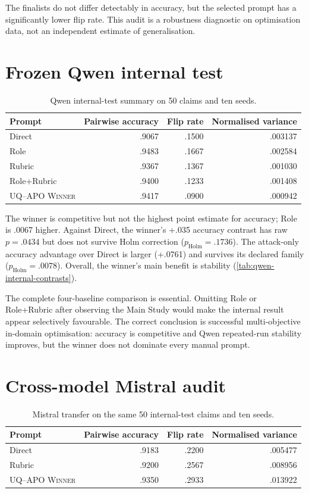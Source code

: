 \documentclass[11pt,twoside,a4paper]{report}
\newcommand{\winner}{\textsc{UQ--APO Winner}}
\newcommand{\holmp}{\ensuremath{p_{\mathrm{Holm}}}}
\begin{document}
The finalists do not differ detectably in accuracy, but the selected prompt has a
significantly lower flip rate.  This audit is a robustness diagnostic on optimisation
data, not an independent estimate of generalisation.

\section{Frozen Qwen internal test}

\begin{table}[htbp]
\centering
\caption{Qwen internal-test summary on 50 claims and ten seeds.}
\label{tab:qwen-internal}
\begin{tabular}{lrrr}
\toprule
Prompt & Pairwise accuracy & Flip rate & Normalised variance \\
\midrule
Direct & .9067 & .1500 & .003137 \\
Role & .9483 & .1667 & .002584 \\
Rubric & .9367 & .1367 & .001030 \\
Role+Rubric & .9400 & .1233 & .001408 \\
\winner & .9417 & .0900 & .000942 \\
\bottomrule
\end{tabular}
\end{table}

The winner is competitive but not the highest point estimate for accuracy; Role is
.0067 higher.  Against Direct, the winner's +.035 accuracy contrast has raw
$p=.0434$ but does not survive Holm correction ($\holmp=.1736$).  The attack-only
accuracy advantage over Direct is larger (+.0761) and survives its declared family
($\holmp=.0078$).  Overall, the winner's main benefit is stability
(\cref{tab:qwen-internal-contrasts}).

The complete four-baseline comparison is essential.  Omitting Role or Role+Rubric
after observing the Main Study would make the internal result appear selectively
favourable.  The correct conclusion is successful multi-objective in-domain
optimisation: accuracy is competitive and Qwen repeated-run stability improves, but
the winner does not dominate every manual prompt.

\section{Cross-model Mistral audit}

\begin{table}[htbp]
\centering
\caption{Mistral transfer on the same 50 internal-test claims and ten seeds.}
\label{tab:mistral-transfer}
\begin{tabular}{lrrr}
\toprule
Prompt & Pairwise accuracy & Flip rate & Normalised variance \\
\midrule
Direct & .9183 & .2200 & .005477 \\
Rubric & .9200 & .2567 & .008956 \\
\winner & .9350 & .2933 & .013922 \\
\bottomrule
\end{tabular}
\end{table}
\end{document}
